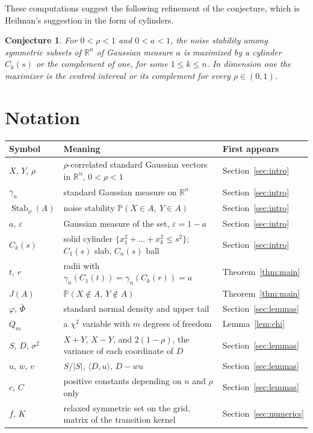 \documentclass[11pt]{amsart}
\newtheorem{conjecture}[theorem]{Conjecture}
\theoremstyle{remark}
\newcommand{\R}{\mathbb{R}}
\newcommand{\Prob}{\mathbb{P}}
\newcommand{\Stab}{\operatorname{Stab}_\rho}
\begin{document}
These computations suggest the following refinement of the conjecture, which is Heilman's suggestion in the form of
cylinders.

\begin{conjecture}\label{conj:cyl}
For $0<\rho<1$ and $0<a<1$, the noise stability among symmetric subsets of $\R^n$ of Gaussian measure $a$ is maximized
by a cylinder $C_k(s)$ or the complement of one, for some $1\le k\le n$. In dimension one the maximizer is the centred
interval or its complement for every $\rho\in(0,1)$.
\end{conjecture}

\section*{Notation}

\begin{center}\begin{tabular}{@{}lp{}l@{}}\toprule
Symbol & Meaning & First appears \\ \midrule
$X$, $Y$, $\rho$ & $\rho$-correlated standard Gaussian vectors in $\R^n$, $0<\rho<1$ & Section~\ref{sec:intro} \\
$\gamma_n$ & standard Gaussian measure on $\R^n$ & Section~\ref{sec:intro} \\
$\Stab(A)$ & noise stability $\Prob(X\in A,\ Y\in A)$ & Section~\ref{sec:intro} \\
$a$, $\varepsilon$ & Gaussian measure of the set, $\varepsilon=1-a$ & Section~\ref{sec:intro} \\
$C_k(s)$ & solid cylinder $\{x_1^2+\dots+x_k^2\le s^2\}$; $C_1(s)$ slab, $C_n(s)$ ball & Section~\ref{sec:intro} \\
$t$, $r$ & radii with $\gamma_n(C_1(t))=\gamma_n(C_k(r))=a$ & Theorem~\ref{thm:main} \\
$J(A)$ & $\Prob(X\notin A,\ Y\notin A)$ & Theorem~\ref{thm:main} \\
$\varphi$, $\bar\Phi$ & standard normal density and upper tail & Section~\ref{sec:lemmas} \\
$Q_m$ & a $\chi^2$ variable with $m$ degrees of freedom & Lemma~\ref{lem:chi} \\
$S$, $D$, $\sigma^2$ & $X+Y$, $X-Y$, and $2(1-\rho)$, the variance of each coordinate of $D$ & Section~\ref{sec:lemmas} \\
$u$, $w$, $v$ & $S/|S|$, $\langle D,u\rangle$, $D-wu$ & Section~\ref{sec:lemmas} \\
$c$, $C$ & positive constants depending on $n$ and $\rho$ only & Section~\ref{sec:lemmas} \\
$f$, $K$ & relaxed symmetric set on the grid, matrix of the transition kernel & Section~\ref{sec:numerics} \\
\bottomrule\end{tabular}\end{center}
\end{document}
